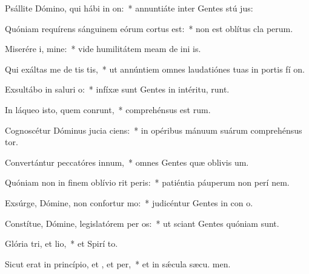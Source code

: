 \item Psállite Dómino, qui hábi in on:~* annuntiáte inter Gentes stú jus:
\item Quóniam requírens sánguinem eórum cortus est:~* non est oblítus cla perum.
\item Miserére i, mine:~* vide humilitátem meam de ini is.
\item Qui exáltas me de tis tis,~* ut annúntiem omnes laudatiónes tuas in portis fí on.
\item Exsultábo in saluri o:~* infíxæ sunt Gentes in intéritu,  runt.
\item In láqueo isto, quem conrunt,~* comprehénsus est  rum.
\item Cognoscétur Dóminus jucia ciens:~* in opéribus mánuum suárum comprehénsus  tor.
\item Convertántur peccatóres  innum,~* omnes Gentes quæ oblivis um.
\item Quóniam non in finem oblívio rit peris:~* patiéntia páuperum non perí  nem.
\item Exsúrge, Dómine, non confortur mo:~* judicéntur Gentes in con o.
\item Constítue, Dómine, legislatórem per os:~* ut sciant Gentes quóniam  sunt.
\item Glória tri, et lio,~* et Spirí to.
\item Sicut erat in princípio, et , et per,~* et in sǽcula sæcu. men.
